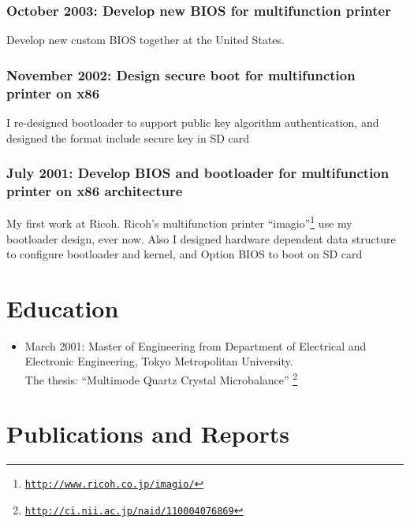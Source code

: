\documentclass[letterpaper]{article}
\begin{document}
\subsubsection*{October 2003: Develop new BIOS for multifunction printer}
Develop new custom BIOS together at the United States.

\subsubsection*{November 2002: Design secure boot for multifunction printer on x86}
I re-designed bootloader to support public key algorithm authentication,
and designed the format include secure key in SD card

\subsubsection*{July 2001: Develop BIOS and bootloader for multifunction printer on x86 architecture}
My first work at Ricoh. Ricoh's multifunction printer
``imagio''\footnote{\href{http://www.ricoh.co.jp/imagio/}{\tt http://www.ricoh.co.jp/imagio/}}
use my bootloader design, ever now.
Also I designed hardware dependent data structure to configure bootloader and kernel,
and Option BIOS to boot on SD card

\section*{Education}

\begin{itemize}
  \item March 2001: Master of Engineering from Department of Electrical and Electronic Engineering, Tokyo Metropolitan University. \\
    The thesis: ``Multimode Quartz Crystal Microbalance''
    \footnote{\href{http://ci.nii.ac.jp/naid/110004076869}{\tt http://ci.nii.ac.jp/naid/110004076869}}
\end{itemize}

\section*{Publications and Reports}
\end{document}
